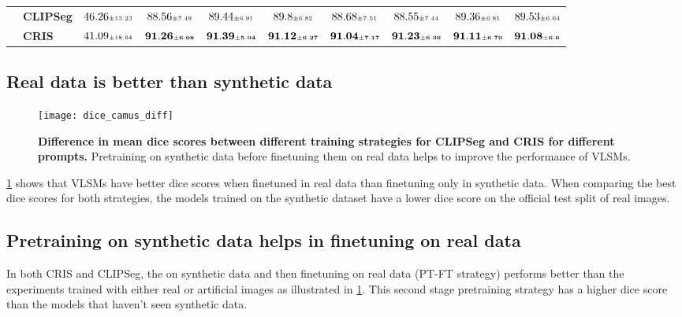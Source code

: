 \documentclass[runningheads]{llncs}
\begin{document}
\begin{table}[h]
{\begin{tabular}{l|l|cccccccc}
            \hline
             & \textbf{CLIPSeg} & $46.26 \scriptscriptstyle \pm 13.23$ & $88.56 \scriptscriptstyle \pm 7.49$ & $89.44 \scriptscriptstyle \pm 6.91$ & $89.8 \scriptscriptstyle \pm 6.82$ & $88.68 \scriptscriptstyle \pm 7.51$ & $88.55 \scriptscriptstyle \pm 7.44$ & $89.36 \scriptscriptstyle \pm 6.81$ & $89.53 \scriptscriptstyle \pm 6.64$\\
            & \textbf{CRIS} & $41.09 \scriptscriptstyle \pm 18.64$ & $\mathbf{91.26 \scriptscriptstyle \pm 6.08}$ & $\mathbf{91.39 \scriptscriptstyle \pm 5.94}$ & $\mathbf{91.12 \scriptscriptstyle \pm 6.27}$ & $\mathbf{91.04 \scriptscriptstyle \pm 7.17}$ & $\mathbf{91.23 \scriptscriptstyle \pm 6.36}$ & $\mathbf{91.11 \scriptscriptstyle \pm 6.79}$ & $\mathbf{91.08 \scriptscriptstyle \pm 6.6}$
        \end{tabular}%
    }
\end{table}

\subsection{Real data is better than synthetic data}

\begin{figure}[h]
    \centering
    \texttt{[image: dice\_camus\_diff]}
    \caption{\textbf{Difference in mean dice scores between different training strategies for CLIPSeg and CRIS for different prompts.}
    Pretraining on synthetic data before finetuning them on real data helps to improve the performance of VLSMs.}
    \label{fig:dice_camus_diff}
\end{figure}

\cref{fig:dice_camus_diff} shows that VLSMs have better dice scores when finetuned in real data than finetuning only in synthetic data.
When comparing the best dice scores for both strategies, the models trained on the synthetic dataset have a lower dice score  on the official test split of real images.

\subsection{Pretraining on synthetic data helps in finetuning on real data}

In both CRIS and CLIPSeg, the  on synthetic data and then finetuning on real data (PT-FT strategy) performs better than the experiments trained with either real or artificial images as illustrated in \cref{fig:dice_camus_diff}.
This second stage pretraining strategy has a higher dice score  than the models that haven't seen synthetic data.
\end{document}
